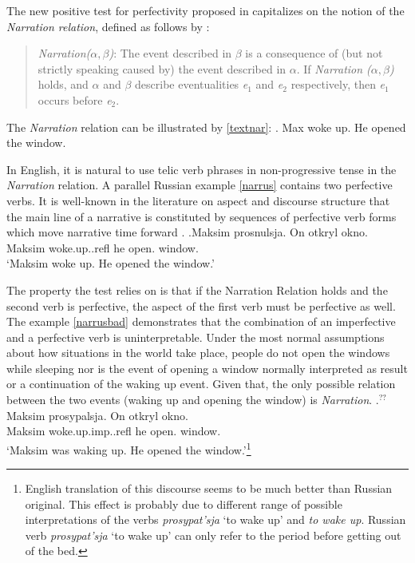 The new positive test for perfectivity proposed in \citet{ZinovaFilip:13} capitalizes on the notion of the \textit{Narration relation}, defined as follows by \citet{Lascarides:93}:

\begin{quote}
\textit{Narration($\alpha,\beta$)}: The event described in $\beta$ is a consequence of (but not strictly speaking caused by) the event described in $\alpha$. If \textit{Narration ($\alpha,\beta$)} holds, and $\alpha$ and $\beta$ describe eventualities \textit{e$_1$} and \textit{e$_2$} respectively, then \textit{e$_1$} occurs before \textit{e$_2$}.
\end{quote}

The \textit{Narration} relation can be illustrated by \ref{textnar}: 
\ex.\label{textnar} Max woke up. He opened the window. 

In English, it is natural to use telic verb phrases in non-progressive tense in the \textit{Narration} relation. A parallel Russian example \ref{narrus} contains two perfective verbs. It is well-known  in the literature on aspect and discourse structure that the main line of a narrative is constituted by sequences of perfective verb forms which move narrative time forward \citep[for Russian, see in particular][]{Paducheva:96, Paducheva:04}.
\exg.\label{narrus}Maksim prosnulsja\textsuperscript{\PF}. On otkryl\textsuperscript{\PF} okno.\\
Maksim woke.up..refl he open. window.\\
\trans `Maksim woke up. He opened the window.'

The property the test relies on is that if the Narration Relation holds and the second verb is perfective, the aspect of the first verb must be perfective as well. The example \ref{narrusbad} demonstrates that the combination of an imperfective and a perfective verb is uninterpretable. Under the most normal assumptions about how situations in the world take place, people do not open the windows while sleeping nor is the event of opening a window normally interpreted as result or a continuation of the waking up event. Given that, the only possible relation between the two events (waking up and opening the window) is \textit{Narration}.
\exg.\label{narrusbad}$^{??}$Maksim prosypalsja\textsuperscript{\IPF}. On otkryl\textsuperscript{\PF} okno.\\
Maksim woke.up.imp..refl he open. window.\\
\trans{}`Maksim was waking up. He opened the window.'\footnote{English translation of this discourse seems to be much better than Russian original. This effect is probably due to different range of possible interpretations of the verbs \textit{prosypat'sja} `to wake up' and \textit{to wake up}. Russian verb \textit{prosypat'sja} `to wake up' can only refer to the period before getting out of the bed.}


